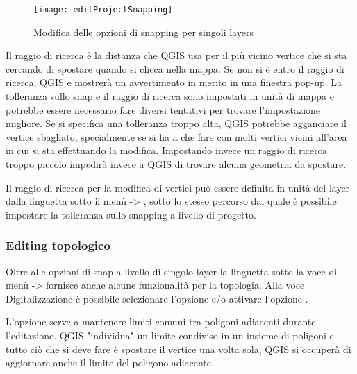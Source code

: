 \begin{figure}[H]
   \begin{center}
   \caption{Modifica delle opzioni di snapping per singoli layers \nixcaption}\label{fig:snappingoptions}\smallskip
   \texttt{[image: editProjectSnapping]} 
\end{center}  
\end{figure}


Il raggio di ricerca è la distanza che QGIS usa per  il più
vicino vertice che si sta cercando di spostare quando si clicca nella mappa.
Se non si è entro il raggio di ricerca, QGIS e mostrerà un avvertimento in
merito in una finestra pop-up.
La tolleranza sullo snap e il raggio di ricerca sono impostati in unità di
mappa e potrebbe essere necessario fare diversi tentativi per trovare
l'impostazione migliore. Se si specifica una tolleranza troppo alta, QGIS
potrebbe agganciare il vertice sbagliato, specialmente se si ha a che fare con
molti vertici vicini all'area in cui si sta effettuando la modifica.
Impostando invece un raggio di ricerca troppo piccolo impedirà invece a QGIS
di trovare alcuna geometria da spostare.

Il raggio di ricerca per la modifica di vertici può essere definita in unità
del layer dalla linguetta  sotto il menù
 -> , sotto lo
stesso percorso dal quale è possibile impostare la tolleranza sullo snapping a
livello di progetto.

\subsubsection{Editing topologico}

Oltre alle opzioni di snap a livello di singolo layer la linguetta
 sotto la voce di menù  ->
 fornisce anche alcune
funzionalità per la topologia. 
Alla voce Digitalizzazione è possibile selezionare l'opzione  e/o attivare l'opzione .


L'opzione  serve a mantenere limiti
comuni tra poligoni adiacenti durante l'editazione. QGIS "individua" un limite
condiviso in un insieme di poligoni e tutto ciò che si deve fare è spostare il
vertice una volta sola, QGIS si occuperà di aggiornare anche il limite del
poligono adiacente.

